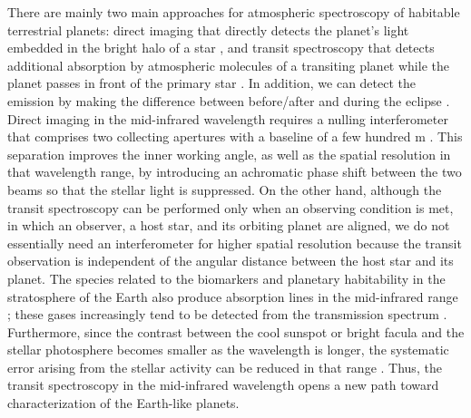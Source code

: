 \documentclass{aastex62}
\begin{document}
There are mainly two main approaches for atmospheric spectroscopy of habitable terrestrial planets: direct imaging that directly detects the planet’s light embedded in the bright halo of a star \citep[e.g.,][]{2006Natur.442...51C, 2007Natur.446..771T}, and transit spectroscopy that detects additional absorption by atmospheric molecules of a transiting planet while the planet passes in front of the primary star \citep[e.g.,][]{2002ApJ...568..377C, 2008Natur.452..329S}. In addition, we can detect the emission by making the difference between before/after and during the eclipse \citep[e.g.,][]{2005Natur.434..740D, 2008ApJ...686.1341C}. Direct imaging in the mid-infrared wavelength requires a nulling interferometer that comprises two collecting apertures with a baseline of a few hundred m \citep[e.g.,][]{1978Natur.274..780B, 1997ApJ...475..373A, 2011ApJ...729...50M}. This separation improves the inner working angle, as well as the spatial resolution in that wavelength range, by introducing an achromatic phase shift between the two beams so that the stellar light is suppressed. On the other hand, although the transit spectroscopy can be performed only when an observing condition is met, in which an observer, a host star, and its orbiting planet are aligned, we do not essentially need an interferometer for higher spatial resolution because the transit observation is independent of the angular distance between the host star and its planet. The species related to the biomarkers and planetary habitability in the stratosphere of the Earth also produce absorption lines in the mid-infrared range \citep{2009ApJ...698..519K}; these gases increasingly tend to be detected from the transmission spectrum \citep[e.g.,][]{2011Cambridge.v1, 2016MNRAS.461L..92B}. Furthermore, since the contrast between the cool sunspot or bright facula and the stellar photosphere becomes smaller as the wavelength is longer, the systematic error arising from the stellar activity can be reduced in that range \citep{2012A&A...539A.140B}. Thus, the transit spectroscopy in the mid-infrared wavelength opens a new path toward characterization of the Earth-like planets.
\end{document}
